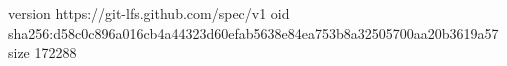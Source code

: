version https://git-lfs.github.com/spec/v1
oid sha256:d58c0c896a016cb4a44323d60efab5638e84ea753b8a32505700aa20b3619a57
size 172288
